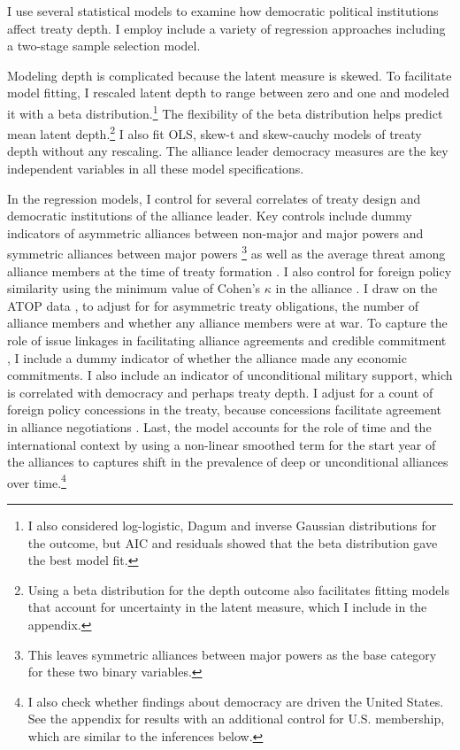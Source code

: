 \documentclass[12pt]{article}
\begin{document}
I use several statistical models to examine how democratic political institutions affect treaty depth.
I employ include a variety of regression approaches including a two-stage sample selection model. 

Modeling depth is complicated because the latent measure is skewed.
To facilitate model fitting, I rescaled latent depth to range between zero and one and modeled it with a beta distribution.\footnote{I also considered log-logistic, Dagum and inverse Gaussian distributions for the outcome, but AIC and residuals showed that the beta distribution gave the best model fit.}
The flexibility of the beta distribution helps predict mean latent depth.\footnote{Using a beta distribution for the depth outcome also facilitates fitting models that account for uncertainty in the latent measure, which I include in the appendix.} 
I also fit OLS, skew-t and skew-cauchy models of treaty depth without any rescaling.
The alliance leader democracy measures are the key independent variables in all these model specifications. 


In the regression models, I control for several correlates of treaty design and democratic institutions of the alliance leader. 
Key controls include dummy indicators of asymmetric alliances between non-major and major powers and symmetric alliances between major powers \citep{Mattes2012}\footnote{This leaves symmetric alliances between major powers as the base category for these two binary variables.} as well as the average threat among alliance members at the time of treaty formation \citep{LeedsSavun2007}. 
I also control for foreign policy similarity using the minimum value of Cohen's $\kappa$ in the alliance \citep{Hage2011}.
I draw on the ATOP data \citep{Leedsetal2002}, to adjust for for asymmetric treaty obligations, the number of alliance members and whether any alliance members were at war. 
To capture the role of issue linkages in facilitating alliance agreements and credible commitment \citep{Poast2012, Poast2013}, I include a dummy indicator of whether the alliance made any economic commitments. 
I also include an indicator of unconditional military support, which is correlated with democracy \citep{Chibaetal2015} and perhaps treaty depth. 
I adjust for a count of foreign policy concessions in the treaty, because concessions facilitate agreement in alliance negotiations \citep{Johnson2015}. 
Last, the model accounts for the role of time and the international context by using a non-linear smoothed term for the start year of the alliances to captures shift in the prevalence of deep or unconditional alliances over time.\footnote{I also check whether findings about democracy are driven the United States. See the appendix for results with an additional control for U.S. membership, which are similar to the inferences below.}
\end{document}
